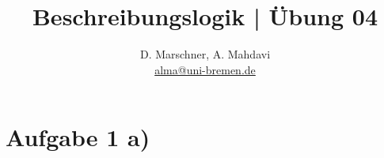 \documentclass[12pt]{article}
\begin{document}
 
\title{Beschreibungslogik | Übung 04}
\author{D. Marschner, A. Mahdavi\\
\href{mailto:alma@uni-bremen.de}{alma@uni-bremen.de}}
\date{}
\maketitle
\section*{Aufgabe 1 a)}


 
\end{document}
